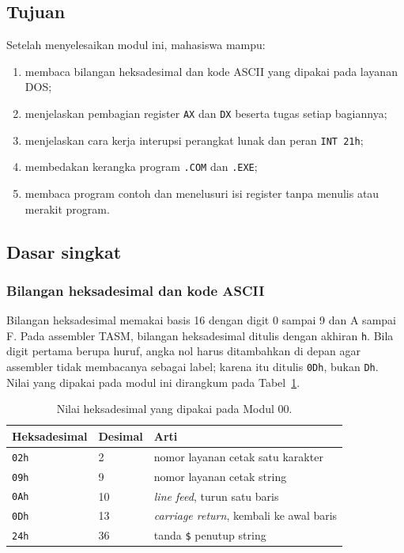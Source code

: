 
\subsection{Tujuan}

\begin{tujuan}
Setelah menyelesaikan modul ini, mahasiswa mampu:
\begin{enumerate}
    \item membaca bilangan heksadesimal dan kode ASCII yang dipakai
          pada layanan DOS;
    \item menjelaskan pembagian register \texttt{AX} dan \texttt{DX}
          beserta tugas setiap bagiannya;
    \item menjelaskan cara kerja interupsi perangkat lunak dan peran
          \texttt{INT 21h};
    \item membedakan kerangka program \texttt{.COM} dan \texttt{.EXE};
    \item membaca program contoh dan menelusuri isi register tanpa
          menulis atau merakit program.
\end{enumerate}
\end{tujuan}

\subsection{Dasar singkat}

\subsubsection*{Bilangan heksadesimal dan kode ASCII}

Bilangan heksadesimal memakai basis 16 dengan digit 0 sampai 9 dan
A sampai F. Pada assembler TASM, bilangan heksadesimal ditulis
dengan akhiran \texttt{h}. Bila digit pertama berupa huruf, angka nol
harus ditambahkan di depan agar assembler tidak membacanya sebagai
label; karena itu ditulis \texttt{0Dh}, bukan \texttt{Dh}. Nilai yang
dipakai pada modul ini dirangkum pada Tabel~\ref{tab:m00-hex}.

\begin{table}[H]
    \centering
    \caption{Nilai heksadesimal yang dipakai pada Modul 00.}
    \label{tab:m00-hex}
    \small
    \begin{tabular}{@{}lll@{}}
        \toprule
        \textbf{Heksadesimal} & \textbf{Desimal} & \textbf{Arti} \\
        \midrule
        \texttt{02h} & 2 & nomor layanan cetak satu karakter \\
        \texttt{09h} & 9 & nomor layanan cetak string \\
        \texttt{0Ah} & 10 & \emph{line feed}, turun satu baris \\
        \texttt{0Dh} & 13 & \emph{carriage return}, kembali ke awal baris \\
        \texttt{24h} & 36 & tanda \texttt{\$} penutup string \\
        \bottomrule
    \end{tabular}
\end{table}

